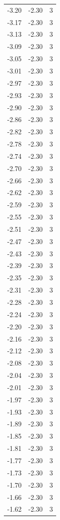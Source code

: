 \begin{longtable}{lrr}
  -3.20 & -2.30 & 3 \\
  -3.17 & -2.30 & 3 \\
  -3.13 & -2.30 & 3 \\
  -3.09 & -2.30 & 3 \\
  -3.05 & -2.30 & 3 \\
  -3.01 & -2.30 & 3 \\
  -2.97 & -2.30 & 3 \\
  -2.93 & -2.30 & 3 \\
  -2.90 & -2.30 & 3 \\
  -2.86 & -2.30 & 3 \\
  -2.82 & -2.30 & 3 \\
  -2.78 & -2.30 & 3 \\
  -2.74 & -2.30 & 3 \\
  -2.70 & -2.30 & 3 \\
  -2.66 & -2.30 & 3 \\
  -2.62 & -2.30 & 3 \\
  -2.59 & -2.30 & 3 \\
  -2.55 & -2.30 & 3 \\
  -2.51 & -2.30 & 3 \\
  -2.47 & -2.30 & 3 \\
  -2.43 & -2.30 & 3 \\
  -2.39 & -2.30 & 3 \\
  -2.35 & -2.30 & 3 \\
  -2.31 & -2.30 & 3 \\
  -2.28 & -2.30 & 3 \\
  -2.24 & -2.30 & 3 \\
  -2.20 & -2.30 & 3 \\
  -2.16 & -2.30 & 3 \\
  -2.12 & -2.30 & 3 \\
  -2.08 & -2.30 & 3 \\
  -2.04 & -2.30 & 3 \\
  -2.01 & -2.30 & 3 \\
  -1.97 & -2.30 & 3 \\
  -1.93 & -2.30 & 3 \\
  -1.89 & -2.30 & 3 \\
  -1.85 & -2.30 & 3 \\
  -1.81 & -2.30 & 3 \\
  -1.77 & -2.30 & 3 \\
  -1.73 & -2.30 & 3 \\
  -1.70 & -2.30 & 3 \\
  -1.66 & -2.30 & 3 \\
  -1.62 & -2.30 & 3 \\

\end{longtable}
